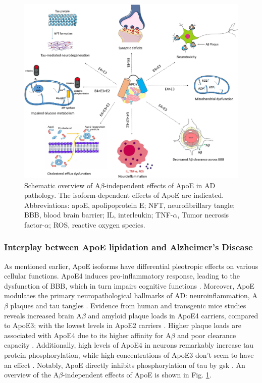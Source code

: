 \documentclass{amsart}
\begin{document}
\begin{figure}[b]
  \includegraphics[width=\textwidth]{figures/ApoEeffects.jpg}
    \caption{Schematic overview of A$\beta$-independent effects of ApoE in AD pathology. The isoform-dependent effects of ApoE are indicated. Abbreviations: apoE, apolipoprotein E; NFT, neurofibrillary tangle; BBB, blood brain barrier; IL, interleukin; TNF-$\alpha$, Tumor necrosis factor-$\alpha$; ROS, reactive oxygen species. \cite{Husain2021APOETherapeutics}}
  \label{ApoeEffects}
\end{figure}

\subsubsection{Interplay between ApoE lipidation and Alzheimer's Disease}\label{ApoEAD}
As mentioned earlier, ApoE isoforms have differential pleotropic effects on various cellular functions. ApoE4 induces pro-inflammatory response, leading to the dysfunction of BBB, which in turn impairs cognitive functions \cite{Marottoli2017PeripheralDysfunction, Teng2017ApoEInjury, Kloske2020TheDisease}. Moreover, ApoE modulates the primary neuropathological hallmarks of AD: neuroinflammation, A$\beta$ plaques and tau tangles \cite{Husain2021APOETherapeutics}. Evidence from human and transgenic mice studies reveals increased brain A$\beta$ and amyloid plaque loads in ApoE4 carriers, compared to ApoE3; with the lowest levels in ApoE2 carriers \cite{Huang2017ApoE2Secretion, Tachibana2016RescuingLRP1, Safieh2019ApoE4:Disease}. Higher plaque loads are associated with ApoE4 due to its higher affinity for A$\beta$ and poor clearance capacity \cite{Kloske2020TheDisease}. Additionally, high levels of ApoE4 in neurons remarkably increase tau protein phosphorylation, while high concentrations of ApoE3 don't seem to have an effect \cite{Cao2017ApoE4-associatedInjury, Shi2017ApoE4Tauopathy, Vasilevskaya2020InteractionAthletes, Wang2018GainCorrector}. Notably,  ApoE directly inhibits phosphorylation of tau by \acrshort{gsk} \cite{Hoe2006ApolipoproteinNeurons}. An overview of the A$\beta$-independent effects of ApoE is shown in Fig. \ref{ApoeEffects}.
\end{document}
